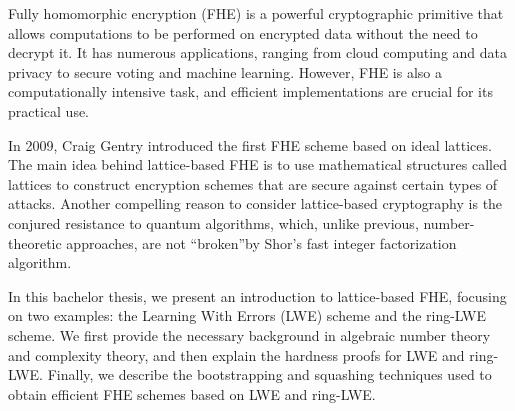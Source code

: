 \iffalse
In 2009 Craig Gentry presented in his PhD thesis the first fully homomorphic encryption (FHE) using ideal lattices. Since then, countless new works have been created implementing his ideas of  ``bootstrapping'' and ``squashing'' to obtain even more efficient homomorphic schemes. In this bachelor thesis we present what the FHE actually is and how we can achieve efficient implementations using two examples -- LWE and ring-LWE lattice-based schemes. To do that, we first present the actual hardness proofs for both of them and then proceed to FHE implementations.
\fi
Fully homomorphic encryption (FHE) is a powerful cryptographic primitive that allows computations to be performed on encrypted data without the need to decrypt it. It has numerous applications, ranging from cloud computing and data privacy to secure voting and machine learning. However, FHE is also a computationally intensive task, and efficient implementations are crucial for its practical use.

In 2009, Craig Gentry introduced the first FHE scheme based on ideal lattices. The main idea behind lattice-based FHE is to use mathematical structures called lattices to construct encryption schemes that are secure against certain types of attacks. Another compelling reason to consider lattice-based cryptography is the conjured resistance to quantum algorithms, which, unlike previous, number-theoretic approaches, are not ``broken''by Shor's fast integer factorization algorithm.

In this bachelor thesis, we present an introduction to lattice-based FHE, focusing on two examples: the Learning With Errors (LWE) scheme and the ring-LWE scheme. We first provide the necessary background in algebraic number theory and complexity theory, and then explain the hardness proofs for LWE and ring-LWE. Finally, we describe the bootstrapping and squashing techniques used to obtain efficient FHE schemes based on LWE and ring-LWE.
